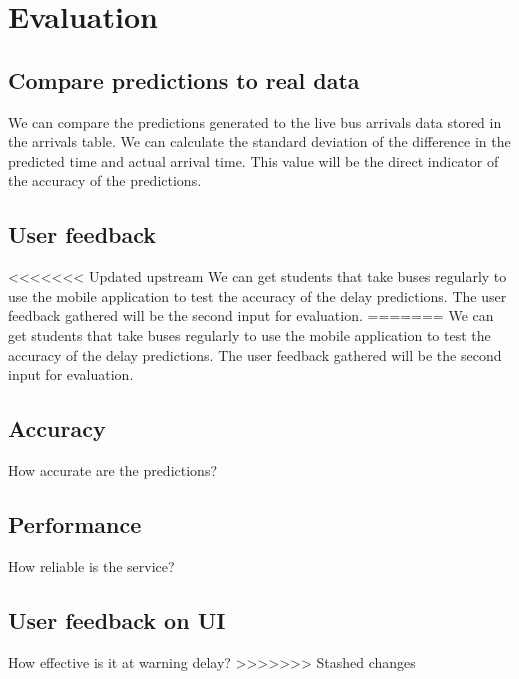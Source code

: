 \chapter{Evaluation}

\section{Compare predictions to real data}
We can compare the predictions generated to the live bus arrivals data stored in the arrivals table. We can calculate the standard deviation of the difference in the predicted time and actual arrival time. This value will be the direct indicator of the accuracy of the predictions.

\section{User feedback}
<<<<<<< Updated upstream
We can get students that take buses regularly to use the mobile application to test the accuracy of the delay predictions. The user feedback gathered will be the second input for evaluation.
=======
We can get students that take buses regularly to use the mobile application to test the accuracy of the delay predictions. The user feedback gathered will be the second input for evaluation.


\section{Accuracy}
How accurate are the predictions?


\section{Performance}
How reliable is the service?

\section{User feedback on UI}
How effective is it at warning delay?
>>>>>>> Stashed changes
